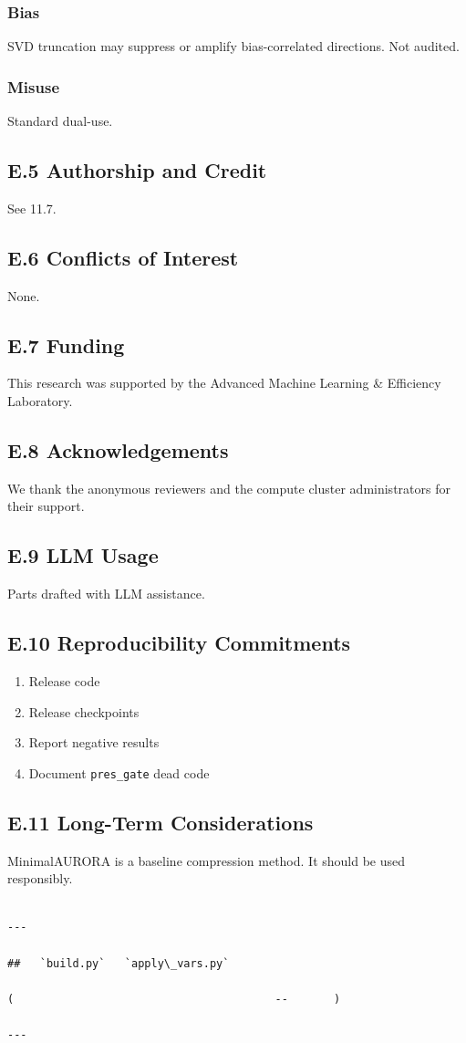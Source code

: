 \subsubsection{Bias}

SVD truncation may suppress or amplify bias-correlated directions. 
Not audited.

\subsubsection{Misuse}

Standard dual-use.

\subsection{E.5 Authorship and Credit}

See  11.7.

\subsection{E.6 Conflicts of Interest}

None.

\subsection{E.7 Funding}

This research was supported by the Advanced Machine Learning \& Efficiency Laboratory.

\subsection{E.8 Acknowledgements}

We thank the anonymous reviewers and the compute cluster administrators for their support.

\subsection{E.9 LLM Usage}

Parts drafted with LLM assistance.

\subsection{E.10 Reproducibility Commitments}

\begin{enumerate}
\item Release code
\item Release checkpoints
\item Report negative results
\item Document \texttt{pres\_gate} dead code

\end{enumerate}
\subsection{E.11 Long-Term Considerations}

MinimalAURORA is a baseline compression method. It should be used 
responsibly.
\begin{lstlisting}

---

##   `build.py`   `apply\_vars.py`

(                                        --       )

---
\end{lstlisting}